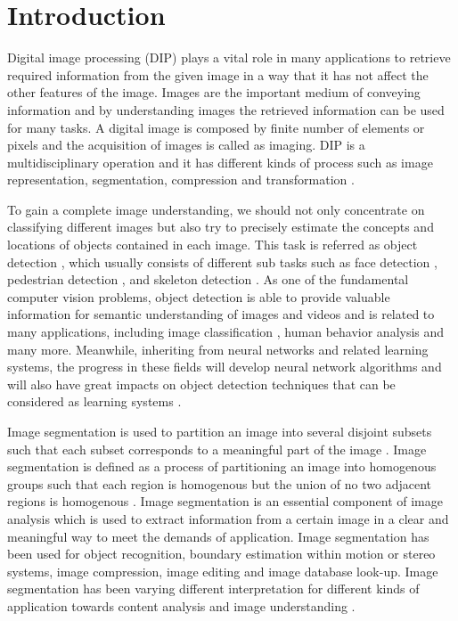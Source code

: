\documentclass[two column]{ieeeaccess}
\begin{document}
\titlepgskip=-15pt

\maketitle

\section{Introduction}
Digital image processing (DIP) plays a vital role in many applications to retrieve required information from the given image in a way that it has not affect the other features of the image. Images are the important medium of conveying information and by understanding images the retrieved information can be used for many tasks. A digital image is composed by finite number of elements or pixels and the acquisition of images is called as imaging. DIP is a multidisciplinary operation and it has different kinds of process such as image representation, segmentation, compression and transformation \cite{0}. 

To gain a complete image understanding, we should not only concentrate on classifying different images but also try to precisely estimate the concepts and locations of objects contained in each image. This task is referred as object detection \cite{1}, which usually consists of different sub tasks such as face detection \cite{2}, pedestrian detection \cite{3}, and skeleton detection \cite{4}. As one of the fundamental computer vision problems, object detection is able to provide valuable information for semantic understanding of images and videos and is related to many applications, including image classification \cite{5,6}, human behavior analysis \cite{7} and many more. Meanwhile, inheriting from neural networks and related learning systems, the progress in these fields will develop neural network algorithms and will also have great impacts on object detection techniques that can be considered as learning systems \cite{11,12,13,14}. 

Image segmentation is used to partition an image into several disjoint subsets such that each subset corresponds to a meaningful part of the image \cite{8}. Image segmentation is defined as a process of partitioning an image into homogenous groups such that each region is homogenous but the union of no two adjacent regions is homogenous \cite{9}. Image segmentation is an essential component of image analysis which is used to extract information from a certain image in a clear and meaningful way to meet the demands of application. Image segmentation has been used for object recognition, boundary estimation within motion or stereo systems, image compression, image editing and image database look-up. Image segmentation has been varying different interpretation for different kinds of application towards content analysis and image understanding \cite{10}.
\end{document}
